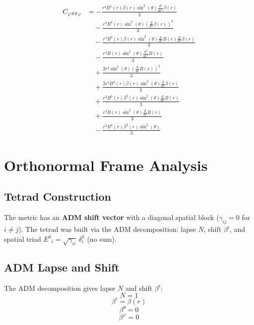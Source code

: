 \documentclass[11pt,a4paper]{article}
\begin{document}
\begin{align*}
  C_{\varphi\,\theta\,\theta\,\varphi} &= - \frac{r^{4} B^{4}{\left(r \right)} \beta{\left(r \right)} \sin^{2}{\left(\theta \right)} \frac{d^{2}}{d r^{2}} \beta{\left(r \right)}}{3} \\
  &\quad - \frac{r^{4} B^{4}{\left(r \right)} \sin^{2}{\left(\theta \right)} \left(\frac{d}{d r} \beta{\left(r \right)}\right)^{2}}{3} \\
  &\quad - \frac{r^{4} B^{3}{\left(r \right)} \beta{\left(r \right)} \sin^{2}{\left(\theta \right)} \frac{d}{d r} B{\left(r \right)} \frac{d}{d r} \beta{\left(r \right)}}{3} \\
  &\quad - \frac{r^{4} B{\left(r \right)} \sin^{2}{\left(\theta \right)} \frac{d^{2}}{d r^{2}} B{\left(r \right)}}{3} \\
  &\quad + \frac{2 r^{4} \sin^{2}{\left(\theta \right)} \left(\frac{d}{d r} B{\left(r \right)}\right)^{2}}{3} \\
  &\quad + \frac{2 r^{3} B^{4}{\left(r \right)} \beta{\left(r \right)} \sin^{2}{\left(\theta \right)} \frac{d}{d r} \beta{\left(r \right)}}{3} \\
  &\quad + \frac{r^{3} B^{3}{\left(r \right)} \beta^{2}{\left(r \right)} \sin^{2}{\left(\theta \right)} \frac{d}{d r} B{\left(r \right)}}{3} \\
  &\quad + \frac{r^{3} B{\left(r \right)} \sin^{2}{\left(\theta \right)} \frac{d}{d r} B{\left(r \right)}}{3} \\
  &\quad - \frac{r^{2} B^{4}{\left(r \right)} \beta^{2}{\left(r \right)} \sin^{2}{\left(\theta \right)}}{3}
\end{align*}
\section{Orthonormal Frame Analysis}
\subsection{Tetrad Construction}
The metric has an \textbf{ADM shift vector} with a diagonal spatial block ($\gamma_{ij} = 0$ for $i \ne j$). The tetrad was built via the ADM decomposition: lapse $N$, shift $\beta^i$, and spatial triad $E^{\hat{a}}{}_i = \sqrt{\gamma_{ii}}\,\delta^{\hat{a}}_i$ (no sum).
\subsection{ADM Lapse and Shift}
The ADM decomposition gives lapse $N$ and shift $\beta^i$:
\begin{dmath*}
  N = 1
\end{dmath*}
\begin{dmath*}
  \beta^{r} = \beta{\left(r \right)}
\end{dmath*}
\begin{dmath*}
  \beta^{\theta} = 0
\end{dmath*}
\begin{dmath*}
  \beta^{\varphi} = 0
\end{dmath*}
\end{document}
